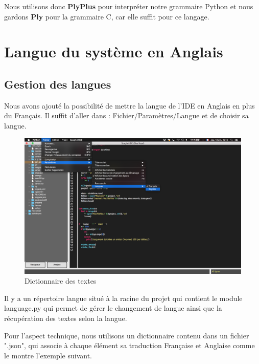 \documentclass[a4paper,12pt]{article}
\begin{document}
			Nous utilisons donc \textbf{PlyPlus} pour interpréter notre grammaire Python et nous gardons \textbf{Ply} pour la grammaire C, car elle suffit pour ce langage.


\section{Langue du système en Anglais}

	\subsection{Gestion des langues}

	Nous avons ajouté la possibilité de mettre la langue de l'IDE en Anglais en plus du Français. Il suffit d'aller dans : Fichier/Paramètres/Langue et de choisir sa langue.\\
	
	\begin{figure}[h!]
			\begin{center}
					\includegraphics[scale=0.3]{images/langues}
					\caption{Dictionnaire des textes}
			\end{center}
	\end{figure}
	
	Il y a un répertoire langue situé à la racine du projet qui contient le module language.py qui permet de gérer le changement de langue ainsi que la récupération des textes selon la langue.
	
	Pour l'aspect technique, nous utilisons un dictionnaire contenu dans un fichier ".json", qui associe à chaque élément sa traduction Française et Anglaise comme le montre l'exemple suivant.
	
\end{document}
